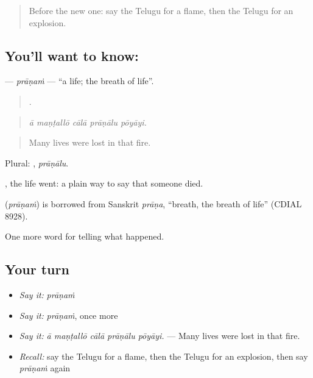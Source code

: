 \label{lesson:TE-C331-pranam}



\begin{quote}
Before the new one: say the Telugu for a flame, then the Telugu for an explosion.
\end{quote}

\subsection*{You'll want to know: }
\textbf{} — \emph{prāṇaṁ} — \textquotedblleft{}a life; the breath of life\textquotedblright{}.

\begin{quote}
    .
\end{quote}

\begin{quote}
\emph{ā maṇṭallō cālā prāṇālu pōyāyi.}
\end{quote}

\begin{quote}
Many lives were lost in that fire.
\end{quote}

Plural: , \emph{prāṇālu}.

 , the life went: a plain way to say that someone died.

\begin{cousinweb}
\textbf{} (\emph{prāṇaṁ}) is borrowed from Sanskrit \emph{prāṇa}, \textquotedblleft{}breath, the breath of life\textquotedblright{} (CDIAL 8928).
\end{cousinweb}

\begin{grammarlens}[title={What you've built}]
One more word for telling what happened.
\end{grammarlens}

\subsection*{Your turn}
\begin{itemize}
\raggedright
  \item \emph{Say it:} \emph{prāṇaṁ}
  \item \emph{Say it:} \emph{prāṇaṁ}, once more
  \item \emph{Say it:} \emph{ā maṇṭallō cālā prāṇālu pōyāyi.} — Many lives were lost in that fire.
  \item \emph{Recall:} say the Telugu for a flame, then the Telugu for an explosion, then say \emph{prāṇaṁ} again
\end{itemize}

